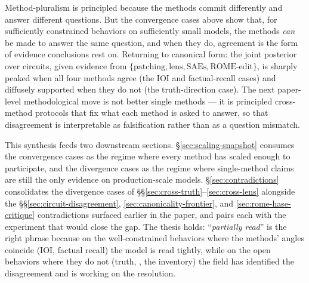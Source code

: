 \begin{intuition}
Method-pluralism is principled because the methods commit
differently and answer different questions. But the convergence
cases above show that, for sufficiently constrained behaviors on
sufficiently small models, the methods \emph{can} be made to
answer the same question, and when they do, agreement is the
form of evidence conclusions rest on. Returning to canonical form: the
joint posterior over circuits, given evidence from
$\{\text{patching}, \text{lens}, \text{SAEs}, \text{ROME-edit}\}$,
is sharply peaked when all four methods agree (the IOI and
factual-recall cases) and diffusely supported when they do not
(the truth-direction case). The next paper-level methodological
move is not better single methods --- it is principled
cross-method protocols that fix what each method is asked to
answer, so that disagreement is interpretable as falsification
rather than as a question mismatch.
\end{intuition}

This synthesis feeds two downstream sections.
\S\ref{sec:scaling-snapshot} consumes the convergence cases as the
regime where every method has scaled enough to participate, and
the divergence cases as the regime where single-method claims are
still the only evidence on production-scale models.
\S\ref{sec:contradictions} consolidates the divergence cases of
\S\S\ref{sec:cross-truth}--\ref{sec:cross-lens} alongside the
\S\S\ref{sec:circuit-disagreement}, \ref{sec:canonicality-frontier},
and \ref{sec:rome-hase-critique} contradictions surfaced earlier
in the paper, and pairs each with the experiment that would close
the gap. The thesis holds: ``\emph{partially read}'' is the right
phrase because on the well-constrained behaviors where the methods'
angles coincide (IOI, factual recall) the model is read tightly,
while on the open behaviors where they do not (truth, ,
the   inventory) the field has identified the
disagreement and is working on the resolution.
